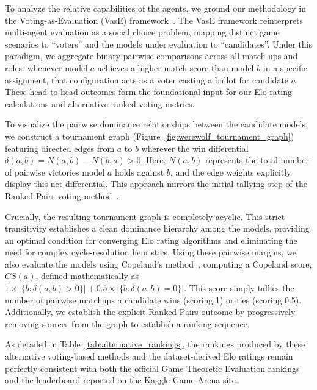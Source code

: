 \documentclass{article}
\begin{document}
To analyze the relative capabilities of the agents, we ground our methodology in the Voting-as-Evaluation (VasE) framework~\citep{lanctot2023evaluating}. The VasE framework reinterprets multi-agent evaluation as a social choice problem, mapping distinct game scenarios to ``voters'' and the models under evaluation to ``candidates''. Under this paradigm, we aggregate binary pairwise comparisons across all match-ups and roles: whenever model $a$ achieves a higher match score than model $b$ in a specific assignment, that configuration acts as a voter casting a ballot for candidate $a$. These head-to-head outcomes form the foundational input for our Elo rating calculations and alternative ranked voting metrics.

To visualize the pairwise dominance relationships between the candidate models, we construct a tournament graph (Figure~\ref{fig:werewolf_tournament_graph}) featuring directed edges from $a$ to $b$ wherever the win differential $\delta(a,b) = N(a,b) - N(b,a) > 0$. Here, $N(a,b)$ represents the total number of pairwise victories model $a$ holds against $b$, and the edge weights explicitly display this net differential. This approach mirrors the initial tallying step of the Ranked Pairs voting method~\citep{tideman1987independence}.

Crucially, the resulting tournament graph is completely acyclic. This strict transitivity establishes a clean dominance hierarchy among the models, providing an optimal condition for converging Elo rating algorithms and eliminating the need for complex cycle-resolution heuristics. Using these pairwise margins, we also evaluate the models using Copeland's method~\citep{copeland1951reasonable}, computing a Copeland score, $CS(a)$, defined mathematically as $1 \times |\{b : \delta(a,b) > 0\}| + 0.5 \times |\{b : \delta(a,b) = 0\}|$. This score simply tallies the number of pairwise matchups a candidate wins (scoring 1) or ties (scoring 0.5). Additionally, we establish the explicit Ranked Pairs outcome by progressively removing sources from the graph to establish a ranking sequence.

As detailed in Table~\ref{tab:alternative_rankings}, the rankings produced by these alternative voting-based methods and the dataset-derived Elo ratings remain perfectly consistent with both the official Game Theoretic Evaluation rankings and the leaderboard reported on the Kaggle Game Arena site.
\end{document}
